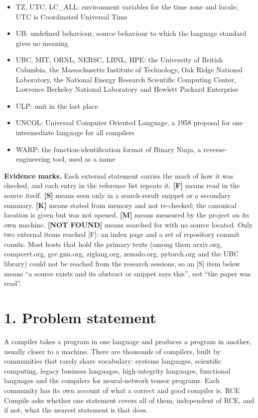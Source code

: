 \documentclass[10pt,letterpaper]{article}
\begin{document}
\begin{itemize}
  names used as they are
\item
  TZ, UTC, LC\_ALL: environment variables for the time zone and locale;
  UTC is Coordinated Universal Time
\item
  UB: undefined behaviour, source behaviour to which the language
  standard gives no meaning
\item
  UBC, MIT, ORNL, NERSC, LBNL, HPE: the University of British Columbia,
  the Massachusetts Institute of Technology, Oak Ridge National
  Laboratory, the National Energy Research Scientific Computing Center,
  Lawrence Berkeley National Laboratory and Hewlett Packard Enterprise
\item
  ULP: unit in the last place
\item
  UNCOL: Universal Computer Oriented Language, a 1958 proposal for one
  intermediate language for all compilers
\item
  WARP: the function-identification format of Binary Ninja, a
  reverse-engineering tool, used as a name
\end{itemize}

\textbf{Evidence marks.} Each external statement carries the mark of how
it was checked, and each entry in the reference list repeats it.
\textbf{{[}F{]}} means read in the source itself. \textbf{{[}S{]}} means
seen only in a search-result snippet or a secondary summary.
\textbf{{[}K{]}} means stated from memory and not re-checked; the
canonical location is given but was not opened. \textbf{{[}M{]}} means
measured by the project on its own machine. \textbf{{[}NOT FOUND{]}}
means searched for with no source located. Only two external items
reached {[}F{]}: an index page and a set of repository commit counts.
Most hosts that hold the primary texts (among them arxiv.org,
compcert.org, gcc.gnu.org, ziglang.org, zenodo.org, pytorch.org and the
UBC library) could not be reached from the research sessions, so an
{[}S{]} item below means ``a source exists and its abstract or snippet
says this'', not ``the paper was read''.

\section{1. Problem statement}\label{problem-statement}

A compiler takes a program in one language and produces a program in
another, usually closer to a machine. There are thousands of compilers,
built by communities that rarely share vocabulary: systems languages,
scientific computing, legacy business languages, high-integrity
languages, functional languages and the compilers for neural-network
tensor programs. Each community has its own account of what a correct
and good compiler is. RCE Compile asks whether one statement covers all
of them, independent of RCE, and if not, what the nearest statement is
that does.
\end{document}
